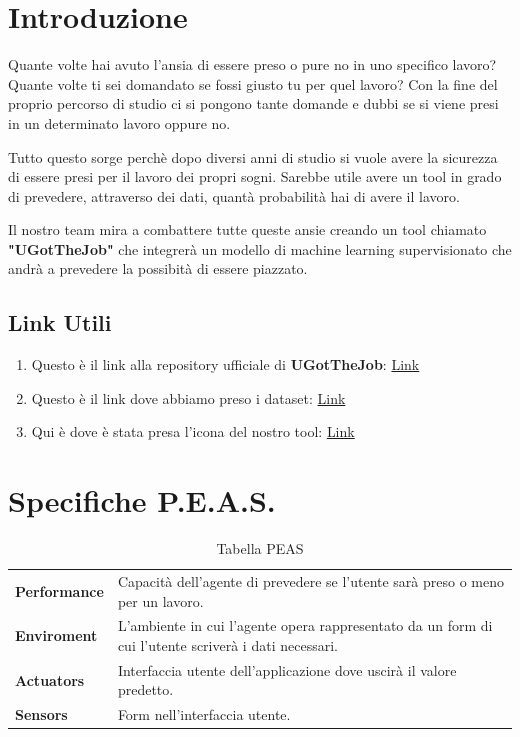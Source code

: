 \documentclass[12pt]{article}
\newcommand{\mainname}{UGotTheJob}
\begin{document}
\newpage %

\tableofcontents

\newpage

\section{Introduzione}
Quante volte hai avuto l'ansia di essere preso o pure no in uno specifico lavoro?
Quante volte ti sei domandato se fossi giusto tu per quel lavoro? Con la fine del proprio percorso
di studio ci si pongono tante domande e dubbi se si viene presi in un determinato lavoro oppure no.
\par
Tutto questo sorge perchè dopo diversi anni di studio si vuole avere la sicurezza di essere presi
per il lavoro dei propri sogni. Sarebbe utile avere un tool in grado di
prevedere, attraverso dei dati, quantà probabilità hai di avere il lavoro.
\par
Il nostro team mira a combattere tutte queste ansie creando un tool chiamato \textbf{"\mainname"}
che integrerà un modello di machine learning supervisionato che andrà a prevedere la possibità di essere piazzato.

\subsection{Link Utili}
\begin{enumerate}
    \item Questo è il link alla repository ufficiale di \textbf{\mainname}: \href{https://github.com/ShackWove/GuessUJob}{Link}
    \item Questo è il link dove abbiamo preso i dataset: \href{https://www.kaggle.com/datasets/ahsan81/job-placement-dataset}{Link}
    \item Qui è dove è stata presa l'icona del nostro tool: \href{https://www.flaticon.com/free-icon/job-seeking_1503438}{Link}
\end{enumerate}

\section{Specifiche P.E.A.S.}

\begin{table}[ht]
    \centering
    \begin{tabular}{| l | m{8cm} |}
        \hline
        \textbf{Performance} & Capacità dell'agente di prevedere se l'utente sarà preso o meno per un lavoro.                       \\
        \textbf{Enviroment}  & L'ambiente in cui l'agente opera rappresentato da un form di cui l'utente scriverà i dati necessari. \\
        \textbf{Actuators}   & Interfaccia utente dell'applicazione dove uscirà il valore predetto.                                 \\
        \textbf{Sensors}     & Form nell'interfaccia utente.                                                                        \\
        \hline
    \end{tabular}
    \caption{Tabella PEAS}
\end{table}
\end{document}
